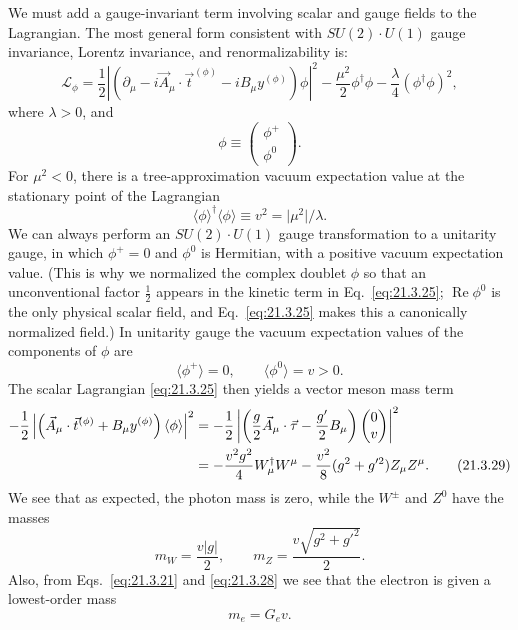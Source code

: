 We must add a gauge-invariant term involving scalar and gauge fields to the Lagrangian. The most general form consistent with $SU(2)\cdot U(1)$ gauge invariance, Lorentz invariance, and renormalizability is:
\begin{equation}
\mathcal{L}_\phi
=\frac{1}{2}\left|
\left(\partial_\mu-i\vec A_\mu\cdot\vec t^{(\phi)}
-iB_\mu y^{(\phi)}\right)\phi
\right|^2
-\frac{\mu^2}{2}\phi^\dagger\phi
-\frac{\lambda}{4}(\phi^\dagger\phi)^2,
\tag{21.3.25}\label{eq:21.3.25}
\end{equation}
where $\lambda>0$, and
\begin{equation}
\phi\equiv\begin{pmatrix}\phi^+\\\phi^0\end{pmatrix}.
\tag{21.3.26}\label{eq:21.3.26}
\end{equation}
For $\mu^2<0$, there is a tree-approximation vacuum expectation value at the stationary point of the Lagrangian
\begin{equation}
\langle\phi\rangle^\dagger\langle\phi\rangle
\equiv v^2=\lvert\mu^2\rvert/\lambda.
\tag{21.3.27}\label{eq:21.3.27}
\end{equation}
We can always perform an $SU(2)\cdot U(1)$ gauge transformation to a unitarity gauge, in which $\phi^+=0$ and $\phi^0$ is Hermitian, with a positive vacuum expectation value. (This is why we normalized the complex doublet $\phi$ so that an unconventional factor $\tfrac12$ appears in the kinetic term in Eq.~\eqref{eq:21.3.25}; $\operatorname{Re}\phi^0$ is the only physical scalar field, and Eq.~\eqref{eq:21.3.25} makes this a canonically normalized field.) In unitarity gauge the vacuum expectation values of the components of $\phi$ are
\begin{equation}
\langle\phi^+\rangle=0,
\qquad
\langle\phi^0\rangle=v>0.
\tag{21.3.28}\label{eq:21.3.28}
\end{equation}
The scalar Lagrangian \eqref{eq:21.3.25} then yields a vector meson mass term
\begin{align}
-\frac{1}{2}
\left|
\left(\vec A_\mu\cdot\vec t^{(\phi)}
+B_\mu y^{(\phi)}\right)\langle\phi\rangle
\right|^2
&=-\frac{1}{2}
\left|
\left(\frac{g}{2}\vec A_\mu\cdot\vec\tau-\frac{g'}{2}B_\mu\right)
\begin{pmatrix}0\\v\end{pmatrix}
\right|^2
\notag\\
&=-\frac{v^2g^2}{4}W_\mu^\dagger W^\mu
-\frac{v^2}{8}(g^2+g'^2)Z_\mu Z^\mu.
\tag{21.3.29}\label{eq:21.3.29}
\end{align}
We see that as expected, the photon mass is zero, while the $W^\pm$ and $Z^0$ have the masses
\begin{equation}
m_W=\frac{v\lvert g\rvert}{2},
\qquad
m_Z=\frac{v\sqrt{g^2+g'^2}}{2}.
\tag{21.3.30}\label{eq:21.3.30}
\end{equation}
Also, from Eqs.~\eqref{eq:21.3.21} and \eqref{eq:21.3.28} we see that the electron is given a lowest-order mass
\begin{equation}
m_e=G_ev.
\tag{21.3.31}\label{eq:21.3.31}
\end{equation}

